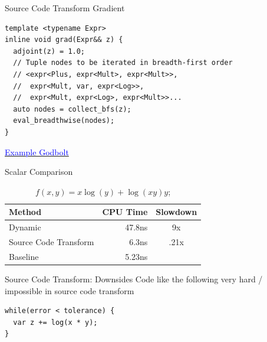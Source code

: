 \documentclass[dvipsnames, aspectratio=169]{beamer}
\begin{document}
\begin{frame}[fragile]{Source Code Transform Gradient}
\begin{verbatim}
template <typename Expr>
inline void grad(Expr&& z) {
  adjoint(z) = 1.0;
  // Tuple nodes to be iterated in breadth-first order
  // <expr<Plus, expr<Mult>, expr<Mult>>,
  //  expr<Mult, var, expr<Log>>,
  //  expr<Mult, expr<Log>, expr<Mult>>...
  auto nodes = collect_bfs(z);
  eval_breadthwise(nodes);
}
\end{verbatim}
\centerline{\href{https://godbolt.org/z/veexMT5vz}{\textcolor{blue}{Example Godbolt}}}
\end{frame}

\begin{frame}{Scalar Comparison}
\begin{table}
  \centering %
  \caption{$f(x, y) = x\log(y) + \log(xy) y$;} %
  \label{tab:firsttable} %
  \begin{tabular}{|l|r|c|} %
    \hline %
    Method & CPU Time & Slowdown \\ %
    \hline %
    Dynamic     & 47.8ns & 9x \\
    Source Code Transform &  6.3ns & .21x \\
    Baseline & 5.23ns & \\
    \hline %
  \end{tabular}
\end{table}
\end{frame}

\begin{frame}[fragile]{Source Code Transform: Downsides}
Code like the following very hard / impossible in source code transform
\begin{verbatim}
while(error < tolerance) {
  var z += log(x * y);
}
\end{verbatim}
\end{frame}
\end{document}

